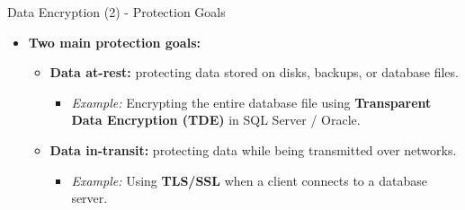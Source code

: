 \begin{frame}{Data Encryption (2) - Protection Goals}
    \Large
    
    \begin{itemize}
        \vspace{-1.2cm}
        
        \item \textbf{Two main protection goals:}
        \begin{itemize}
            \large
            \setlength{\itemsep}{0.3cm}
            
            \item \textbf{Data at-rest:} protecting data stored on disks, backups, or database files.
            \begin{itemize}
                \normalsize
                \item \textit{Example:} Encrypting the entire database file using \textbf{Transparent Data Encryption (TDE)} in SQL Server / Oracle.
            \end{itemize}
            
            \item \textbf{Data in-transit:} protecting data while being transmitted over networks.
            \begin{itemize}
                \normalsize
                \item \textit{Example:} Using \textbf{TLS/SSL} when a client connects to a database server.
            \end{itemize}
        \end{itemize}
    \end{itemize}
\end{frame}


